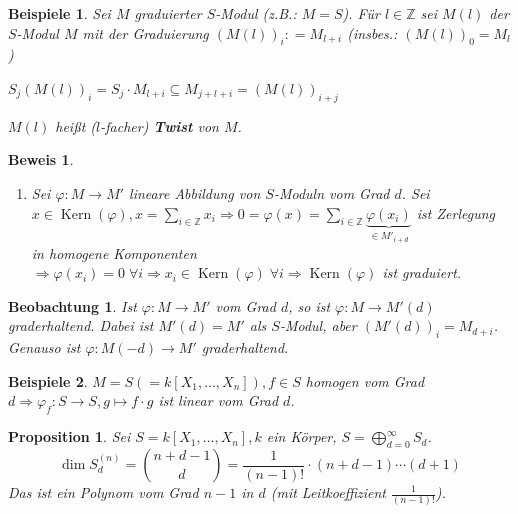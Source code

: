 \documentclass[a4paper,12pt]{scrbook}
\theoremstyle{break}
\newtheorem{Prop}[Def]{Proposition}
\theoremstyle{nonumberbreak}
\newtheorem{Bew}{Beweis}
\newtheorem{nnBsp}{Beispiele}
\newtheorem{Beo}{Beobachtung}
\theoremstyle{nonumberplain}
\newcommand{\emp}[1]{\textbf{\emph{#1}}}
\newcommand{\defeqr}[0]{\mathrel{\mathop:}=}
\DeclareMathOperator{\Kern}{Kern}
\begin{document}
\begin{nnBsp}
Sei $M$ graduierter $S$-Modul (z.B.: $M=S$). Für $l \in \mathbb{Z}$ sei
$M(l)$ der $S$-Modul $M$ mit der Graduierung $(M(l))_i\defeqr M_{l+i}$
(insbes.: $(M(l))_0 = M_l$)

$S_j(M(l))_i=S_j\cdot M_{l+i}\subseteq M_{j+l+i}=(M(l))_{i+j}$

$M(l)$ heißt ($l$-facher) \emp{Twist} von $M$.
\end{nnBsp}

\begin{Bew}
  \begin{enumerate}
    \item[(d)] Sei $\varphi: M \to M'$ lineare Abbildung von $S$-Moduln vom Grad
    $d$. Sei $x \in \Kern(\varphi), x = \sum_{i \in \mathbb{Z}} x_i
    \Rightarrow 0 = \varphi(x) = \sum_{i \in \mathbb{Z}} \underset{\in M'_{i +
    d}}{\underbrace{\varphi(x_i)}}$ ist Zerlegung in homogene Komponenten
    $\Rightarrow \varphi(x_i) = 0 \; \forall i \Rightarrow x_i \in \Kern(\varphi) \; \forall i \Rightarrow \Kern(\varphi)$ ist graduiert.
  \end{enumerate}
\end{Bew}

\begin{Beo}
  Ist $\varphi: M \to M'$ vom Grad $d$, so ist $\varphi: M \to M'(d)$
  graderhaltend. Dabei ist $M'(d) = M'$ als $S$-Modul, aber $(M'(d))_i = M_{d
  +i}$. Genauso ist $\varphi: M(-d) \to M'$ graderhaltend.
\end{Beo}

\begin{nnBsp}
  $M = S (=k[X_1, \dots, X_n]), f \in S$ homogen vom Grad $d \Rightarrow
  \varphi_f: S \to S, g \mapsto f \cdot g$ ist linear vom Grad $d$.
\end{nnBsp}

\begin{Prop}
  Sei $S = k[X_1, \dots, X_n], k$ ein Körper, $S = \bigoplus_{d = 0}^{\infty} S_d$.
  $$\dim S_d^{(n)} = {n+d-1 \choose d} = \frac{1}{(n-1)!} \cdot (n+d-1) \cdots (d+1)$$
  Das ist ein Polynom vom Grad $n-1$ in $d$ (mit Leitkoeffizient $\frac{1}{(n-1)!}$).
\end{Prop}
\end{document}
